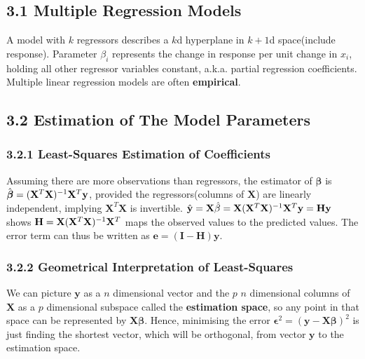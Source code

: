 \begin{multicols*}{3}
\setlength{\premulticols}{1pt}
\setlength{\postmulticols}{1pt}
\setlength{\multicolsep}{1pt}
\setlength{\columnsep}{2pt}

\subsection{3.1 Multiple Regression Models}
A model with $k$ regressors describes a $k$d hyperplane in $k+1$d space(include response). Parameter $\beta_i$ represents the change in response per unit change in $x_i$, holding all other regressor variables constant, a.k.a. partial regression coefficients. Multiple linear regression models are often \textbf{empirical}.

\subsection{3.2 Estimation of The Model Parameters}
\subsubsection{3.2.1 Least-Squares Estimation of Coefficients}
Assuming there are more observations than regressors, the estimator of $\boldsymbol{\beta}$ is $\hat{\boldsymbol{\beta}} = (\mathbf{X}^T\mathbf{X})^{-1} \mathbf{X}^T\mathbf{y}$, provided the regressors(columns of $\mathbf{X}$) are linearly independent, implying $\mathbf{X}^T\mathbf{X}$ is invertible. $\hat{\mathbf{y}} = \mathbf{X}\hat{\beta} = \mathbf{X}(\mathbf{X}^T\mathbf{X})^{-1}\mathbf{X}^T\mathbf{y} = \mathbf{H}\mathbf{y}$ shows $\mathbf{H} = \mathbf{X}(\mathbf{X}^T\mathbf{X})^{-1}\mathbf{X}^T$ maps the observed values to the predicted values. The error term can thus be written as $\mathbf{e} = (\mathbf{I} - \mathbf{H})\mathbf{y}$.

\subsubsection{3.2.2 Geometrical Interpretation of Least-Squares}
We can picture $\mathbf{y}$ as a $n$ dimensional vector and the $p$ $n$ dimensional columns of $\mathbf{X}$ as a $p$ dimensional subspace called the \textbf{estimation space}, so any point in that space can be represented by $\mathbf{X}\boldsymbol{\beta}$. Hence, minimising the error $\boldsymbol{\epsilon}^2 = (\mathbf{y} - \mathbf{X}\boldsymbol{\beta})^2$ is just finding the shortest vector, which will be orthogonal, from vector $\mathbf{y}$ to the estimation space.


\end{multicols*}
